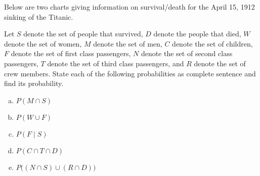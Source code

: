 \documentclass[11pt,letterpaper]{article}
\begin{document}
 Below are two charts giving information on survival/death for the April 15, 1912 sinking of the Titanic. \par
        \begin{table}[h]
        \centering
         \hfill {}
        \end{table} \par
Let $S$ denote the set of people that survived, $D$ denote the people that died, $W$ denote the set of women, $M$ denote the set of men, $C$ denote the set of children, $F$ denote the set of first class passengers, $N$ denote the set of second class passengers, $T$ denote the set of third class passengers, and $R$ denote the set of crew members. State each of the following probabilities as complete sentence and find its probability. 
	\begin{enumerate}[(a)]
	\item $P(M \cap S)$
	\item $P(W \cup F)$
	\item $P(F \;|\; S)$
	\item $P(C \cap T \cap D)$
	\item $P\big( (N \cap S) \cup (R \cap D) \big)$
	\end{enumerate}
\end{document}
